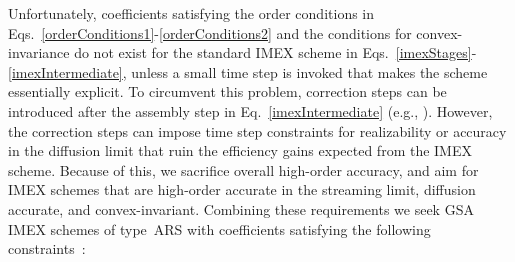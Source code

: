 Unfortunately, coefficients satisfying the order conditions in Eqs.~\eqref{orderConditions1}-\eqref{orderConditions2} and the conditions for convex-invariance do not exist for the standard IMEX scheme in Eqs.~\eqref{imexStages}-\eqref{imexIntermediate}, unless a small time step is invoked that makes the scheme essentially explicit.  
To circumvent this problem, correction steps can be introduced after the assembly step in Eq.~\eqref{imexIntermediate} (e.g., \cite{chertock_etal_2015,hu_etal_2018}).  
However, the correction steps can impose time step constraints for realizability or accuracy in the diffusion limit that ruin the efficiency gains expected from the IMEX scheme.  
Because of this, we sacrifice overall high-order accuracy, and aim for IMEX schemes that are high-order accurate in the streaming limit, diffusion accurate, and convex-invariant.  
Combining these requirements we seek GSA IMEX schemes of type~ARS with coefficients satisfying the following constraints~\cite{hu_etal_2018,chu_etal_2018}:
